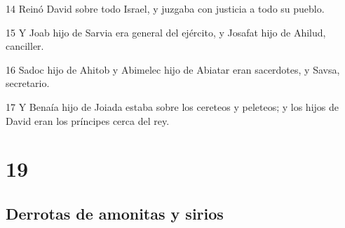 \par 14 Reinó David sobre todo Israel, y juzgaba con justicia a todo su pueblo.
\par 15 Y Joab hijo de Sarvia era general del ejército, y Josafat hijo de Ahilud, canciller.
\par 16 Sadoc hijo de Ahitob y Abimelec hijo de Abiatar eran sacerdotes, y Savsa, secretario.
\par 17 Y Benaía hijo de Joiada estaba sobre los cereteos y peleteos; y los hijos de David eran los príncipes cerca del rey. 

\chapter{19}

\section*{Derrotas de amonitas y sirios}

